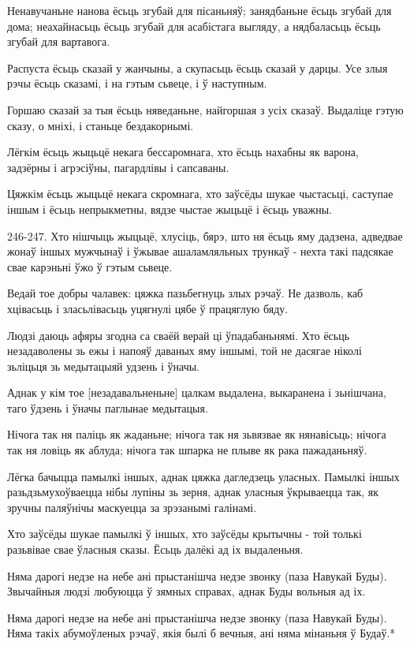 \documentclass{article}
\begin{document}
Ненавучаньне нанова ёсьць згубай для пісаньняў; занядбаньне ёсьць
згубай для дома; неахайнасьць ёсьць згубай для асабістага выгляду, а
нядбаласьць ёсьць згубай для вартавога.

Распуста ёсьць сказай у жанчыны, а скупасьць ёсьць сказай у дарцы.
Усе злыя рэчы ёсьць сказамі, і на гэтым сьвеце, і ў наступным.

Горшаю сказай за тыя ёсьць няведаньне, найгоршая з усіх сказаў.
Выдаліце гэтую сказу, о мніхі, і станьце бездакорнымі.

Лёгкім ёсьць жыцьцё некага бессаромнага, хто ёсьць нахабны як
варона, задзёрны і агрэсіўны, пагардлівы і сапсаваны.

Цяжкім ёсьць жыцьцё некага скромнага, хто заўсёды шукае чыстасьці,
саступае іншым і ёсьць непрыкметны, вядзе чыстае жыцьцё і ёсьць уважны.

246-247. Хто нішчыць жыцьцё, хлусіць, бярэ, што ня ёсьць яму дадзена,
адведвае жонаў іншых мужчынаў і ўжывае ашаламляльных трункаў - нехта
такі падсякае свае карэньні ўжо ў гэтым сьвеце.

Ведай тое добры чалавек: цяжка пазьбегнуць злых рэчаў. Не дазволь,
каб хцівасьць і зласьлівасьць уцягнулі цябе ў працяглую бяду.

Людзі даюць афяры згодна са сваёй верай ці ўпадабаньнямі. Хто ёсьць
незадаволены зь ежы і напояў даваных яму іншымі, той не дасягае ніколі
зьліцьця зь медытацыяй удзень і ўначы.

Аднак у кім тое {[}незадавальненьне{]} цалкам выдалена, выкаранена
і зьнішчана, таго ўдзень і ўначы паглынае медытацыя.

Нічога так ня паліць як жаданьне; нічога так ня зьвязвае як
нянавісьць; нічога так ня ловіць як аблуда; нічога так шпарка не плыве
як рака пажаданьняў.

Лёгка бачыцца памылкі іншых, аднак цяжка дагледзець уласных.
Памылкі іншых разьдзьмухоўваецца нібы лупіны зь зерня, аднак уласныя
ўкрываецца так, як зручны паляўнічы маскуецца за зрэзанымі галінамі.

Хто заўсёды шукае памылкі ў іншых, хто заўсёды крытычны - той
толькі разьвівае свае ўласныя сказы. Ёсьць далёкі ад іх выдаленьня.

Няма дарогі недзе на небе ані прыстанішча недзе звонку (паза
Навукай Буды). Звычайныя людзі любуюцца ў зямных справах, аднак Буды
вольныя ад іх.

Няма дарогі недзе на небе ані прыстанішча недзе звонку (паза
Навукай Буды). Няма такіх абумоўленых рэчаў, якія былі б вечныя, ані
няма мінаньня ў Будаў.*
\end{document}
